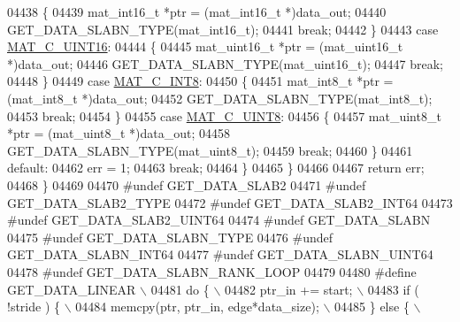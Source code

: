 \begin{DoxyCode}
{{{{{{{{{{{{{{{{{{{{{{{{{04438             \{
04439                 mat\_int16\_t *ptr = (mat\_int16\_t *)data\_out;
04440                 GET\_DATA\_SLABN\_TYPE(mat\_int16\_t);
04441                 \textcolor{keywordflow}{break};
04442             \}
04443             \textcolor{keywordflow}{case} \hyperlink{group___m_a_t_ggad4d60ae7b709fc81bfd744fb4c857c40a8bede21dbf6c1edc0bbccc1481bccae7}{MAT\_C\_UINT16}:
04444             \{
04445                 mat\_uint16\_t *ptr = (mat\_uint16\_t *)data\_out;
04446                 GET\_DATA\_SLABN\_TYPE(mat\_uint16\_t);
04447                 \textcolor{keywordflow}{break};
04448             \}
04449             \textcolor{keywordflow}{case} \hyperlink{group___m_a_t_ggad4d60ae7b709fc81bfd744fb4c857c40a984ff310f9e906100fcff95f704f43c5}{MAT\_C\_INT8}:
04450             \{
04451                 mat\_int8\_t *ptr = (mat\_int8\_t *)data\_out;
04452                 GET\_DATA\_SLABN\_TYPE(mat\_int8\_t);
04453                 \textcolor{keywordflow}{break};
04454             \}
04455             \textcolor{keywordflow}{case} \hyperlink{group___m_a_t_ggad4d60ae7b709fc81bfd744fb4c857c40a81270f8093cb4808e992c1d29d84d4e3}{MAT\_C\_UINT8}:
04456             \{
04457                 mat\_uint8\_t *ptr = (mat\_uint8\_t *)data\_out;
04458                 GET\_DATA\_SLABN\_TYPE(mat\_uint8\_t);
04459                 \textcolor{keywordflow}{break};
04460             \}
04461             \textcolor{keywordflow}{default}:
04462                 err = 1;
04463                 \textcolor{keywordflow}{break};
04464         \}
04465     \}
04466 
04467     \textcolor{keywordflow}{return} err;
04468 \}
04469 
04470 \textcolor{preprocessor}{#undef GET\_DATA\_SLAB2}
04471 \textcolor{preprocessor}{#undef GET\_DATA\_SLAB2\_TYPE}
04472 \textcolor{preprocessor}{#undef GET\_DATA\_SLAB2\_INT64}
04473 \textcolor{preprocessor}{#undef GET\_DATA\_SLAB2\_UINT64}
04474 \textcolor{preprocessor}{#undef GET\_DATA\_SLABN}
04475 \textcolor{preprocessor}{#undef GET\_DATA\_SLABN\_TYPE}
04476 \textcolor{preprocessor}{#undef GET\_DATA\_SLABN\_INT64}
04477 \textcolor{preprocessor}{#undef GET\_DATA\_SLABN\_UINT64}
04478 \textcolor{preprocessor}{#undef GET\_DATA\_SLABN\_RANK\_LOOP}
04479 
04480 \textcolor{preprocessor}{#define GET\_DATA\_LINEAR \(\backslash\)}
04481 \textcolor{preprocessor}{    do \{ \(\backslash\)}
04482 \textcolor{preprocessor}{        ptr\_in += start; \(\backslash\)}
04483 \textcolor{preprocessor}{        if ( !stride ) \{ \(\backslash\)}
04484 \textcolor{preprocessor}{            memcpy(ptr, ptr\_in, edge*data\_size); \(\backslash\)}
04485 \textcolor{preprocessor}{        \} else \{ \(\backslash\)}
}}}}}}}}}}}}}}}}}}}}}}}}}
\end{DoxyCode}

